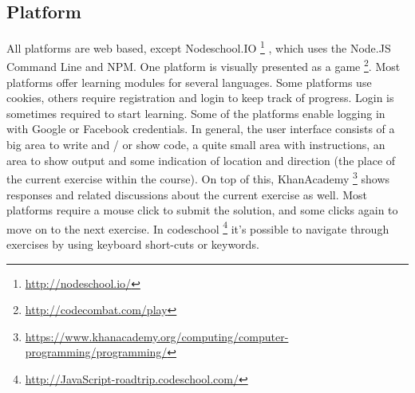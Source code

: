 \documentclass{article}
\begin{document}
\subsection{Platform}
All platforms are web based, except Nodeschool.IO
\footnote{\url{http://nodeschool.io/}}
, which uses the Node.JS 
Command Line and NPM. One platform is visually presented as a game
\footnote{\url{http://codecombat.com/play}}. Most platforms offer learning
modules for several languages. Some platforms use cookies, 
others require registration and login to keep track of progress. Login is 
sometimes required to start learning. Some of the platforms enable logging in 
with Google or Facebook credentials. \newline
In general, the user interface consists of a big area to write and / or show 
code, a quite small area with instructions, an area to show output and some 
indication of location and direction (the place of the current exercise within 
the course). On top of this, KhanAcademy
\footnote{
\url{https://www.khanacademy.org/computing/computer-programming/programming/}} 
shows responses and related discussions about the current exercise as
well. Most platforms require a mouse click to submit the solution, and some
clicks again to
move on to the next exercise. In codeschool
\footnote{\url{http://JavaScript-roadtrip.codeschool.com/}} 
it's possible to navigate through exercises by using keyboard short-cuts or 
keywords.
\end{document}

